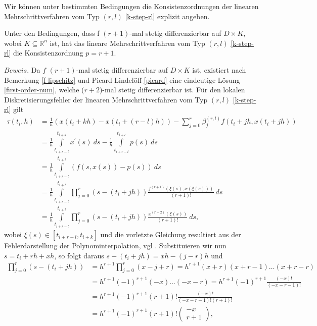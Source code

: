 Wir können unter bestimmten Bedingungen die Konsistenzordnungen der linearen Mehrschrittverfahren vom Typ $(r,l)$
\eqref{k-step-rl} explizit angeben.
\begin{satz}
    Unter den Bedingungen, dass f $(r+1)$-mal stetig differenzierbar auf $D \times K$, wobei $K \subseteq \mathbb{R}^n$ ist, hat
    das lineare Mehrschrittverfahren vom Typ $(r,l)$ \eqref{k-step-rl} die Konsistenzordnung $p=r+1$.
\end{satz}
$Beweis.$ Da $f$ $(r+1)$-mal stetig differenzierbar auf $D \times K$ ist, existiert nach Bemerkung \ref{f-lipschitz} und
Picard-Lindelöff \ref{picard} eine eindeutige Lösung \eqref{first-order-num}, welche ($r+2$)-mal stetig differenzierbar
ist. Für den lokalen Diskretisierungsfehler der linearen Mehrschrittverfahren vom Typ $(r,l)$ \eqref{k-step-rl} gilt
\begin{align*}
    \tau(t_i, h) &= \frac{1}{h} (x(t_i + kh) - x(t_i + (r-l)h)) -
    \sum\limits_{j=0}^{r}\beta_j^{(r,l)}f(t_i+jh, x(t_i +jh))\\
    &= \frac{1}{h} \int\limits_{t_{i+r-l}}^{t_{i+k}} x^{\prime}(s)\ ds -
    \frac{1}{h} \int\limits_{t_{i+r-l}}^{t_{i+l}} p(s)\ ds \\
    &= \frac{1}{h} \int\limits_{t_{i+r-l}}^{t_{i+l}} \left( f(s,x(s)) - p(s) \right)\ ds \\
    &= \frac{1}{h} \int\limits_{t_{i+r-l}}^{t_{i+l}} \prod\limits_{j=0}^{r} (s - (t_i + jh))
    \frac{f^{(r+1)}(\xi(s),x(\xi(s)))}{(r+1)!}\ ds\\
    &= \frac{1}{h} \int\limits_{t_{i+r-l}}^{t_{i+l}} \prod\limits_{j=0}^{r} (s - (t_i + jh))
    \frac{x^{(r+2)}(\xi(s))}{(r+1)!}\ ds,
\end{align*}
wobei $\xi(s) \in [t_{i+r-l}, t_{i+k}]$ und die vorletzte Gleichung resultiert aus der Fehlerdarstellung der
Polynominterpolation, vgl \cite[213]{p.deuflharda.hohmannNumerischeMathematik2018}. Substituieren wir nun
$s = t_i + rh + xh$, so folgt daraus $s- (t_i +jh) = xh - (j-r)h$ und
\begin{align*}
    \prod\limits_{j=0}^{r} (s - (t_i +jh)) &= h^{r+1} \prod\limits_{j=0}^{r} (x-j+r) = h^{r+1}(x+r)(x+r-1) \dots (x+r-r)\\
    &= h^{r+1}(-1)^{r+1}(-x)\dots (-x-r) = h^{r+1}(-1)^{r+1}\frac{(-x)!}{(-x-r-1)!}\\
    &= h^{r+1}(-1)^{r+1}(r+1)! \frac{(-x)!}{(-x-r-1)!(r+1)!}\\
&= h^{r+1}(-1)^{r+1}(r+1)! \begin{pmatrix}  -x \\  r+1  \end{pmatrix},
\end{align*}
